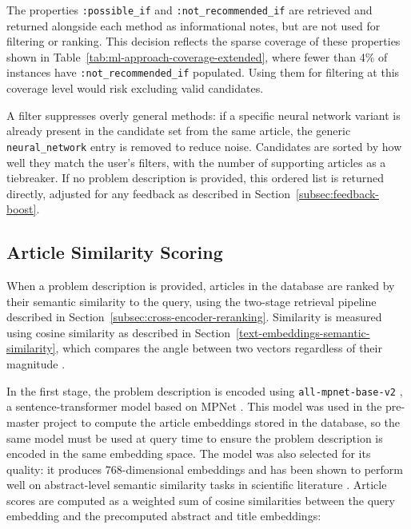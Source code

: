 The properties \texttt{:possible\_if} and 
\texttt{:not\_recommended\_if} are retrieved and returned 
alongside each method as informational notes, but are not used 
for filtering or ranking. This decision reflects the sparse 
coverage of these properties shown in 
Table~\ref{tab:ml-approach-coverage-extended}, where fewer than 
4\% of instances have \texttt{:not\_recommended\_if} populated. 
Using them for filtering at this coverage level would risk 
excluding valid candidates.

A filter suppresses overly general methods: if a specific neural 
network variant is already present in the candidate set from the 
same article, the generic \texttt{neural\_network} entry is 
removed to reduce noise. Candidates are sorted by how well they 
match the user's filters, with the number of supporting articles 
as a tiebreaker. If no problem description is provided, this 
ordered list is returned directly, adjusted for any feedback as 
described in Section~\ref{subsec:feedback-boost}.

\subsection{Article Similarity Scoring}
\label{subsec:article-similarity-scoring}

When a problem description is provided, articles in the database 
are ranked by their semantic similarity to the query, using the 
two-stage retrieval pipeline described in 
Section~\ref{subsec:cross-encoder-reranking}. Similarity is 
measured using cosine similarity as described in 
Section~\ref{text-embeddings-semantic-similarity}, which compares 
the angle between two vectors regardless of their magnitude 
\parencite[Chapter~5.4]{jurafsky_martin2026speech_language_processing}.

In the first stage, the problem description is encoded using 
\texttt{all-mpnet-base-v2} \parencite{sbert_mpnet}, a 
sentence-transformer model based on MPNet 
\parencite{song2020mpnet}. This model was used in the pre-master 
project \parencite{bergsto2026mlselection} to compute the article 
embeddings stored in the database, so the same model must be used 
at query time to ensure the problem description is encoded in the 
same embedding space. The model was also selected for its quality: 
it produces 768-dimensional embeddings and has been shown to 
perform well on abstract-level semantic similarity tasks in 
scientific literature 
\parencite{galli2024performance_pre_trained_sentence_transformer_models, 
colangelo2025comparative_analysis_sentence_transformer_models}. 
Article scores are computed as a weighted sum of cosine 
similarities between the query embedding and the precomputed 
abstract and title embeddings:

